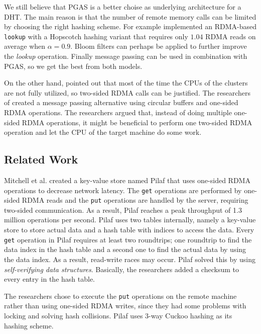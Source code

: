We still believe that PGAS is a better choise as underlying architecture for a DHT. The main reason is that the number of remote memory calls can be limited by choosing the right hashing scheme. For example \cite{farm} implemented an RDMA-based \texttt{lookup} with a Hopscotch hashing variant that requires only $1.04$ RDMA reads on average when $\alpha = 0.9$. Bloom filters can perhaps be applied to further improve the \emph{lookup} operation. Finally message passing can be used in combination with PGAS, so we get the best from both models.

On the other hand, \cite{farm} pointed out that most of the time the CPUs of the clusters are not fully utilized, so two-sided RDMA calls can be justified. The researchers of \cite{farm} created a message passing alternative using circular buffers and one-sided RDMA operations. The researchers argued that, instead of doing multiple one-sided RDMA operations, it might be beneficial to perform one two-sided RDMA operation and let the CPU of the target machine do some work.

\subsection{Related Work}
Mitchell et al. \cite{pilaf} created a key-value store named Pilaf that uses one-sided RDMA operations to decrease network latency. The \texttt{get} operations are performed by one-sided RDMA reads and the \texttt{put} operations are handled by the server, requiring two-sided communication. As a result, Pilaf reaches a peak throughput of 1.3 million operations per second. Pilaf uses two tables internally, namely a key-value store to store actual data and a hash table with indices to access the data. Every \texttt{get} operation in Pilaf requires at least two roundtrips; one roundtrip to find the data index in the hash table and a second one to find the actual data by using the data index. As a result, read-write races may occur. Pilaf solved this by using \emph{self-verifying data structures}. Basically, the researchers added a checksum to every entry in the hash table. 

The researchers chose to execute the \texttt{put} operations on the remote machine rather than using one-sided RDMA writes, since they had some problems with locking and solving hash collisions. Pilaf uses 3-way Cuckoo hashing as its hashing scheme.

